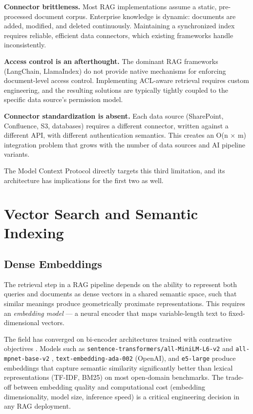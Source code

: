 \textbf{Connector brittleness.} Most RAG implementations assume a static, pre-processed document corpus. Enterprise knowledge is dynamic: documents are added, modified, and deleted continuously. Maintaining a synchronized index requires reliable, efficient data connectors, which existing frameworks handle inconsistently.

\textbf{Access control is an afterthought.} The dominant RAG frameworks (LangChain, LlamaIndex) do not provide native mechanisms for enforcing document-level access control. Implementing ACL-aware retrieval requires custom engineering, and the resulting solutions are typically tightly coupled to the specific data source's permission model.

\textbf{Connector standardization is absent.} Each data source (SharePoint, Confluence, S3, databases) requires a different connector, written against a different API, with different authentication semantics. This creates an O(n × m) integration problem that grows with the number of data sources and AI pipeline variants.

The Model Context Protocol directly targets this third limitation, and its architecture has implications for the first two as well.

\section{Vector Search and Semantic Indexing}
\label{sec:bg-vector}

\subsection{Dense Embeddings}

The retrieval step in a RAG pipeline depends on the ability to represent both queries and documents as dense vectors in a shared semantic space, such that similar meanings produce geometrically proximate representations. This requires an \textit{embedding model} — a neural encoder that maps variable-length text to fixed-dimensional vectors.

The field has converged on bi-encoder architectures trained with contrastive objectives \citep{Karpukhin2020DPR}. Models such as \texttt{sentence-transformers/all-MiniLM-L6-v2} and \texttt{all-mpnet-base-v2} \citep{Reimers2019}, \texttt{text-embedding-ada-002} (OpenAI), and \texttt{e5-large} \citep{Wang2022} produce embeddings that capture semantic similarity significantly better than lexical representations (TF-IDF, BM25) on most open-domain benchmarks. The trade-off between embedding quality and computational cost (embedding dimensionality, model size, inference speed) is a critical engineering decision in any RAG deployment.

